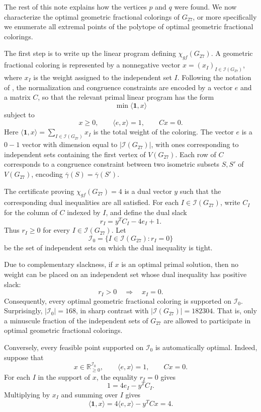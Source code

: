 \documentclass[pdflatex,sn-mathphys-num]{sn-jnl}%
\newcommand{\G}{G_{27}}
\begin{document}
The rest of this note explains how the vertices $p$ and $q$ were found.
We now characterize the optimal geometric fractional colorings of $G_{27}$, or more specifically we enumerate all extremal points of the polytope of optimal geometric fractional colorings. 

The first step is to write up the linear program defining
$\chi_{gf}(G_{27})$. A geometric fractional coloring is represented by a
nonnegative vector $x=(x_I)_{I\in\mathcal{I}(\G)}$, where $x_I$ is the weight
assigned to the independent set $I$. Following the notation of \cite{MRVZ}, the
normalization and congruence constraints are encoded by a vector $e$ and a matrix
$C$, so that the relevant primal linear program has the form
\[
    \min \langle \mathbf{1},x\rangle
\]
subject to
\[
    x\geq 0,\qquad \langle e,x\rangle=1,\qquad Cx=0.
\]
Here $\langle \mathbf{1},x\rangle=\sum_{I\in\mathcal{I}(\G)}x_I$ is the total
weight of the coloring.
The vector $e$ is a $0-1$ vector with dimension equal to $|\mathcal{I}(\G)|$, with ones corresponding to independent sets containing the first vertex of $V(\G)$. Each row of $C$ corresponds to a congruence constraint between two isometric subsets $S, S'$ of $V(\G)$, encoding $\overline\gamma(S) = \overline\gamma(S')$.

The certificate proving $\chi_{gf}(G_{27})=4$ is a dual vector $y$
such that the corresponding dual inequalities are all satisfied. For each
$I\in\mathcal{I}(\G)$, write $C_I$ for the column of $C$ indexed by $I$, and define
the dual slack
\[
    r_I = y^T C_I - 4 e_I + 1 .
\]
Thus $r_I\geq 0$ for every $I\in\mathcal{I}(\G)$. Let
\[
    \mathcal{I}_0=\{I\in\mathcal{I}(\G): r_I=0\}
\]
be the set of independent sets on which the dual inequality is tight.

Due to complementary slackness, if $x$ is an
optimal primal solution, then no weight can be placed on an independent set
whose dual inequality has positive slack:
\[
    r_I>0 \quad\Longrightarrow\quad x_I=0 .
\]
Consequently, every optimal geometric fractional coloring is supported on
$\mathcal{I}_0$. Surprisingly, $|\mathcal{I}_0| = 168$, in sharp contrast with $|\mathcal{I}(G_{27})|=182304$. That is, only a minuscule fraction of the independent sets of $G_{27}$ are allowed to participate in optimal geometric fractional colorings.

Conversely, every feasible point supported on $\mathcal{I}_0$
is automatically optimal. Indeed, suppose that
\[
    x\in \mathbb{R}_{\geq 0}^{\mathcal{I}_0},\qquad
    \langle e,x\rangle=1,\qquad
    Cx=0 .
\]
For each $I$ in the support of $x$, the equality $r_I=0$ gives
\[
    1 = 4e_I - y^T C_I .
\]
Multiplying by $x_I$ and summing over $I$ gives
\[
    \langle \mathbf{1},x\rangle
    =
    4\langle e,x\rangle - y^T Cx
    =
    4 .
\]
\end{document}
